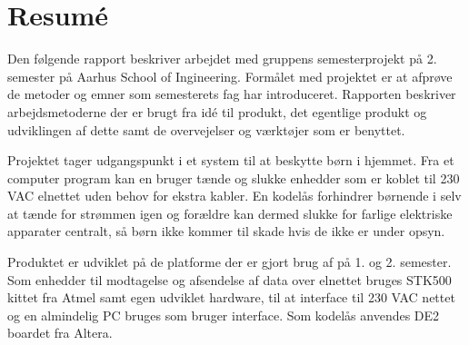 \chapter{Resumé}

Den følgende rapport beskriver arbejdet med gruppens semesterprojekt på 2. semester på Aarhus School of Ingineering. Formålet med projektet er at afprøve de metoder og emner som semesterets fag har introduceret. Rapporten beskriver arbejdsmetoderne der er brugt fra idé til produkt, det egentlige produkt og udviklingen af dette samt de overvejelser og værktøjer som er benyttet.

Projektet tager udgangspunkt i et system til at beskytte børn i hjemmet. Fra et computer program kan en bruger tænde og slukke enhedder som er koblet til 230 VAC elnettet uden behov for ekstra kabler. En kodelås forhindrer børnende i selv at tænde for strømmen igen og forældre kan dermed slukke for farlige elektriske apparater centralt, så børn ikke kommer til skade hvis de ikke er under opsyn. 

Produktet er udviklet på de platforme der er gjort brug af på 1. og 2. semester. Som enhedder til modtagelse og afsendelse af data over elnettet bruges STK500 kittet fra Atmel samt egen udviklet hardware, til at interface til 230 VAC nettet og en almindelig PC bruges som bruger interface. Som kodelås anvendes DE2 boardet fra Altera.


